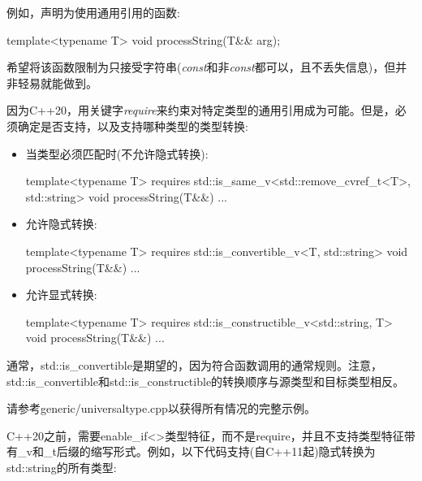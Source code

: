 例如，声明为使用通用引用的函数:\par

\begin{codebox}[cpp]
template<typename T>
void processString(T&& arg);
\end{codebox}


希望将该函数限制为只接受字符串(\textit{const}和非\textit{const}都可以，且不丢失信息)，但并非轻易就能做到。\par

因为C++20，用关键字\textit{require}来约束对特定类型的通用引用成为可能。但是，必须确定是否支持，以及支持哪种类型的类型转换:\par

\begin{itemize}
  \item 当类型必须匹配时(不允许隐式转换):\par
\begin{codebox}[cpp]
    template<typename T>
    requires std::is_same_v<std::remove_cvref_t<T>, std::string>
    void processString(T&&) {
      ...
    }
\end{codebox}
  \item 允许隐式转换:\par
\begin{codebox}[cpp]
  template<typename T>
  requires std::is_convertible_v<T, std::string>
  void processString(T&&) {
    ...
  }
\end{codebox}
  \item 允许显式转换:
\begin{codebox}[cpp]
  template<typename T>
  requires std::is_constructible_v<std::string, T>
  void processString(T&&) {
    ...
  }
\end{codebox}
\end{itemize}

通常，std::is\_convertible是期望的，因为符合函数调用的通常规则。注意，std::is\_convertible和std::is\_constructible的转换顺序与源类型和目标类型相反。\par

请参考generic/universaltype.cpp以获得所有情况的完整示例。\par

C++20之前，需要enable\_if<>类型特征，而不是require，并且不支持类型特征带有\_v和\_t后缀的缩写形式。例如，以下代码支持(自C++11起)隐式转换为std::string的所有类型:\par

